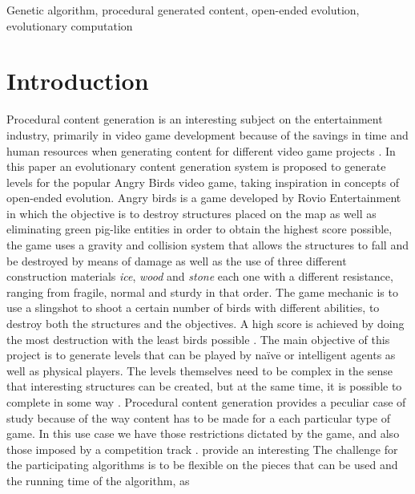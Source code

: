 \documentclass[conference]{IEEEtran}
\begin{document}
    \begin{IEEEkeywords}
    Genetic algorithm, procedural generated content, open-ended evolution,
    evolutionary computation
    \end{IEEEkeywords}
    
    \section{Introduction}
    Procedural content generation is an interesting subject on the entertainment
    industry, primarily in video game development because of the savings in time
    and human resources when generating content for different video game
    projects \cite{Yannakakis2017,YannakakisContentGeneration}. In this paper an
    evolutionary content generation system is proposed to generate levels for
    the popular Angry Birds video game, taking inspiration in concepts of
    open-ended evolution. Angry birds is a game developed by Rovio Entertainment
    in which the objective is to destroy structures placed on the map as well as
    eliminating green pig-like entities in order to obtain the highest score
    possible, the game uses a gravity and collision system that allows the
    structures to fall and be destroyed by means of damage as well as the use of
    three different construction materials \textit{ice}, \textit{wood} and
    \textit{stone} each one with a different resistance, ranging from fragile,
    normal and sturdy in that order. The game mechanic is to use a slingshot to
    shoot a certain number of birds with different abilities, to destroy both
    the structures and the objectives. A high score is achieved by doing the
    most destruction with the least birds possible 
    \cite{RovioEntertainmentCorporation2009}.
    The main objective of this project is to generate levels that can be played
    by naïve or intelligent agents as well as physical players. The levels
    themselves need to be complex in the sense that interesting structures can be
    created, but at the same time, it is possible to complete in some way
    \cite{Stephenson,Stephenson2018}.
    Procedural content generation provides a peculiar case of study because of the
    way %
    content has to be made for a each particular type of game. In this use case we
    have those restrictions dictated by the game, and also those imposed by a
    competition track \cite{Renz}.
    provide an interesting The challenge for the participating algorithms is to be
    flexible on the pieces that can be used and the running time of the algorithm, as
\end{document}
